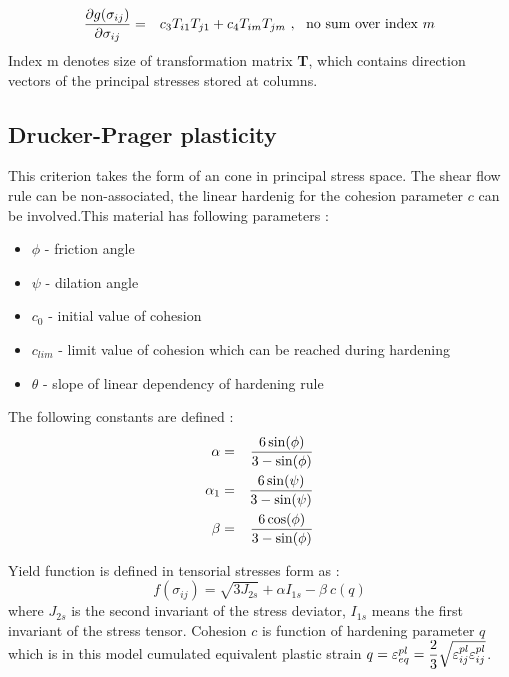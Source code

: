 \begin{eqnarray}
\mbox{$\displaystyle\frac{\partial{g(\sigma_{ij})}}{\partial{\sigma_{ij}}}$} &=& c_3 T_{i1} T_{j1} + c_4 T_{im} T_{jm} {\rm \ ,\ \ no\ sum\ over\ index\ } m
\end{eqnarray}
Index m denotes size of transformation matrix {\bf T}, which contains direction vectors of the principal stresses
stored at columns.


\subsection{Drucker-Prager plasticity}
\label{sectdruckpargmodel}

This criterion takes the form of an cone in principal stress space. The shear flow rule can be non-associated,
the linear hardenig for the cohesion parameter $c$ can be involved.This material has following parameters :
\begin {itemize}
\item $\phi$ - friction angle 
\item $\psi$ - dilation angle 
\item $c_0$ - initial value of cohesion 
\item $c_{lim}$ - limit value of cohesion which can be reached during hardening
\item $\theta$ - slope of linear dependency of hardening rule
\end {itemize}

The following constants are defined :
\begin {eqnarray}
\alpha   &=& \mbox{$\displaystyle\frac{6\sin(\phi)}{3-\sin(\phi)}$} \\
\alpha_1 &=& \mbox{$\displaystyle\frac{6\sin(\psi)}{3-\sin(\psi)}$} \\
\beta    &=& \mbox{$\displaystyle\frac{6\cos(\phi)}{3-\sin(\phi)}$}
\end{eqnarray}

Yield function is defined in tensorial stresses form as :
\begin{equation}
f(\sigma_{ij}) = \sqrt{3 J_{2s}} + \alpha I_{1s} - \beta\ c(q)
\end{equation}
where $J_{2s}$ is  the second invariant of the stress deviator, $I_{1s}$ means the first invariant of the stress tensor.
Cohesion $c$ is function of hardening parameter $q$ which is in this model cumulated equivalent plastic strain
$q = \varepsilon_{eq}^{pl} = \mbox{$\displaystyle\frac{2}{3}$}\sqrt{\varepsilon_{ij}^{pl} \varepsilon_{ij}^{pl}}$.

